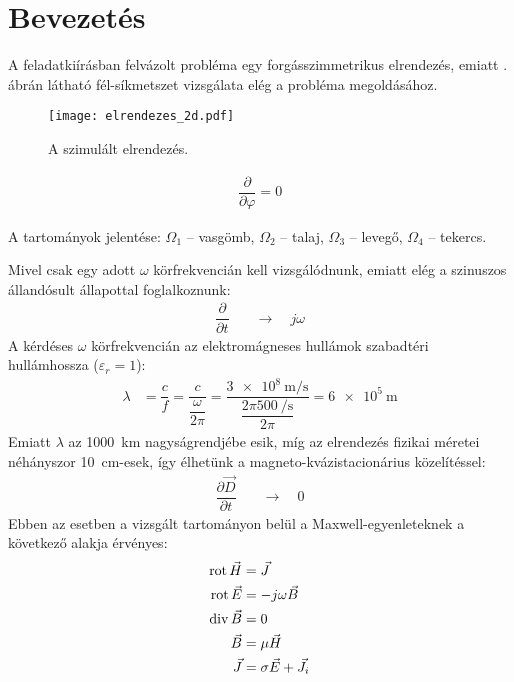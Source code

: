 \section{Bevezetés}
    A feladatkiírásban felvázolt probléma egy forgásszimmetrikus elrendezés, emiatt . ábrán látható fél-síkmetszet vizsgálata elég a probléma megoldásához.

    \begin{wrapfigure}{L}{0.35\textwidth}
        \centering
        \texttt{[image: elrendezes\_2d.pdf]}
        \caption{A szimulált elrendezés.}
        \label{fig:elrendezes_2d}
    \end{wrapfigure}

    \begin{align}
        \dfrac{\partial}{\partial \varphi} = 0
    \end{align}
    
    A tartományok jelentése: $\Omega_1$ -- vasgömb, $\Omega_2$ -- talaj, $\Omega_3$ -- levegő, $\Omega_4$ -- tekercs.

    Mivel csak egy adott $\omega$ körfrekvencián kell vizsgálódnunk, emiatt elég a szinuszos állandósult állapottal foglalkoznunk:
    \begin{align}
        \dfrac{\partial}{\partial t} \quad&\longrightarrow\quad j\omega
    \end{align}
    A kérdéses $\omega$ körfrekvencián az elektromágneses hullámok szabadtéri hullámhossza ($\varepsilon_r = 1$):
    \begin{align}
        \lambda &= \dfrac{c}{f} = \dfrac{c}{\dfrac{\omega}{2\pi}} = \dfrac{\qty{3e8}{\metre\per\second}}{\dfrac{2\pi\qty{500}{\per\second}}{2\pi}} = \qty{6e5}{\metre}
    \end{align}
    Emiatt $\lambda$ az \qty{1000}{km} nagyságrendjébe esik, míg az elrendezés fizikai méretei néhányszor \qty{10}{cm}-esek, így élhetünk a magneto-kvázistacionárius közelítéssel:
    \begin{align}
        \dfrac{\partial \vec{D}}{\partial t} \quad&\longrightarrow\quad 0
    \end{align}
    \clearpage
    Ebben az esetben a vizsgált tartományon belül a Maxwell-egyenleteknek a következő alakja érvényes:
    \begin{align}
        \operatorname{rot} \vec{H} &= \vec{J} \\
        \operatorname{rot} \vec{E} &= -j\omega\vec{B}\\
        \operatorname{div} \vec{B} &= 0\\
        \vec{B} &= \mu\vec{H}\\
        \vec{J} &= \sigma \vec{E} + \vec{J}_i
    \end{align}

